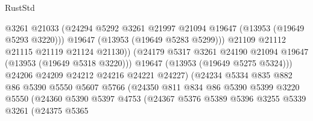 \begin{lexlean}{RustStd}
\begin{coremodule}
                                      @3261
                                      @21033
                                      (@24294
                                        @5292
                                        @3261
                                        @21997
                                        @21094
                                        @19647
                                        (@13953 (@19649 @5293 @3220)))
                                      @19647
                                      (@13953 (@19649 @5283 @5299)))
                                    @21109
                                    @21112
                                    @21115
                                    @21119
                                    @21124
                                    @21130))
                                (@24179
                                  @5317
                                  @3261
                                  @24190
                                  @21094
                                  @19647
                                  (@13953 (@19649 @5318 @3220)))
                                @19647
                                (@13953 (@19649 @5275 @5324)))
                              @24206
                              @24209
                              @24212
                              @24216
                              @24221
                              @24227)
                            (@24234
                              @5334
                              @835
                              @882
                              @86
                              @5390
                              @5550
                              @5607
                              @5766
                              (@24350
                                @811
                                @834
                                @86
                                @5390
                                @5399
                                @3220
                                @5550
                                (@24360
                                  @5390
                                  @5397
                                  @4753
                                  (@24367
                                    @5376
                                    @5389
                                    @5396
                                    @3255
                                    @5339
                                    @3261
                                    (@24375
                                      @5365

\end{coremodule}
\end{lexlean}
